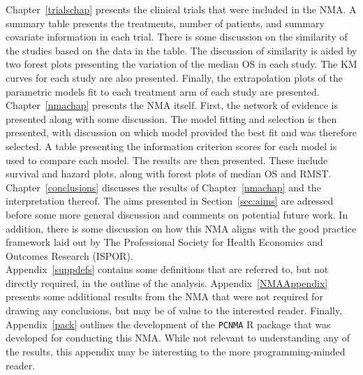 Chapter~\ref{trialschap} presents the clinical trials that were included in the NMA. A summary table presents the treatments, number of patients, and summary covariate information in each trial. There is some discussion on the similarity of the studies based on the data in the table. The discussion of similarity is aided by two forest plots presenting the variation of the median OS in each study. The KM curves for each study are also presented. Finally, the extrapolation plots of the parametric models fit to each treatment arm of each study are presented. \\

Chapter~\ref{nmachap} presents the NMA itself. First, the network of evidence is presented along with some discussion. The model fitting and selection is then presented, with discussion on which model provided the best fit and was therefore selected. A table presenting the information criterion scores for each model is used to compare each model. The results are then presented. These include survival and hazard plots, along with forest plots of median OS and RMST. \\

Chapter~\ref{conclusions} discusses the results of Chapter~\ref{nmachap} and the interpretation thereof. The aims presented in Section~\ref{sec:aims} are adressed before some more general discussion and comments on potential future work. In addition, there is some discussion on how this NMA aligns with the good practice framework laid out by The Professional Society for Health Economics and Outcomes Research (ISPOR).\\

Appendix~\ref{suppdefs} contains some definitions that are referred to, but not directly required, in the outline of the analysis. Appendix~\ref{NMAAppendix} presents some additional results from the NMA that were not required for drawing any conclusions, but may be of value to the interested reader. Finally, Appendix~\ref{pack} outlines the development of the \verb|PCNMA| R package that was developed for conducting this NMA. While not relevant to understanding any of the results, this appendix may be interesting to the more programming-minded reader.